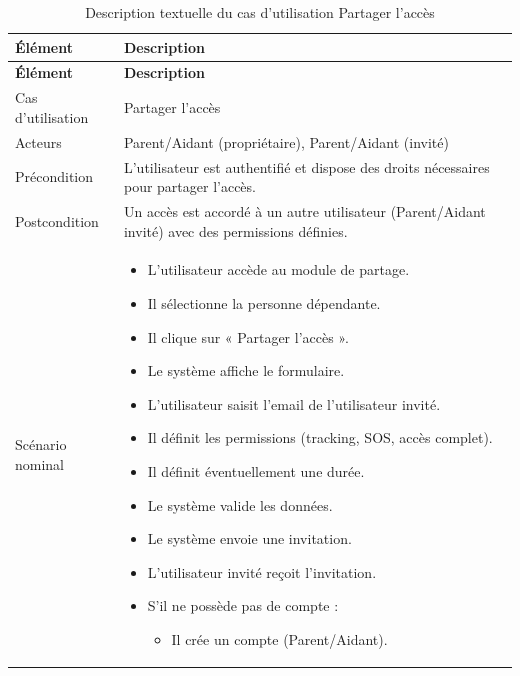 \small
\renewcommand{\arraystretch}{1.1}
\setlength{\parskip}{0pt}
\begin{longtable}{|p{}|>{\raggedright\arraybackslash}p{}|}
\caption{Description textuelle du cas d'utilisation Partager l'accès} \\ \hline
\textbf{Élément} & \textbf{Description} \\ \hline
\endfirsthead

\hline
\textbf{Élément} & \textbf{Description} \\ \hline
\endhead

\hline
\endlastfoot

Cas d'utilisation & Partager l'accès \\ \hline

Acteurs & Parent/Aidant (propriétaire), Parent/Aidant (invité) \\ \hline

Précondition & L’utilisateur est authentifié et dispose des droits nécessaires pour partager l’accès. \\ \hline

Postcondition & Un accès est accordé à un autre utilisateur (Parent/Aidant invité) avec des permissions définies. \\ \hline

Scénario nominal &
\begin{itemize}
\item L’utilisateur accède au module de partage.
\item Il sélectionne la personne dépendante.
\item Il clique sur « Partager l’accès ».
\item Le système affiche le formulaire.

\item L’utilisateur saisit l’email de l’utilisateur invité.
\item Il définit les permissions (tracking, SOS, accès complet).
\item Il définit éventuellement une durée.

\item Le système valide les données.
\item Le système envoie une invitation.

\item L’utilisateur invité reçoit l’invitation.

\item S’il ne possède pas de compte :
\begin{itemize}
\item Il crée un compte (Parent/Aidant).
\end{itemize}


\end{itemize}
\end{longtable}
